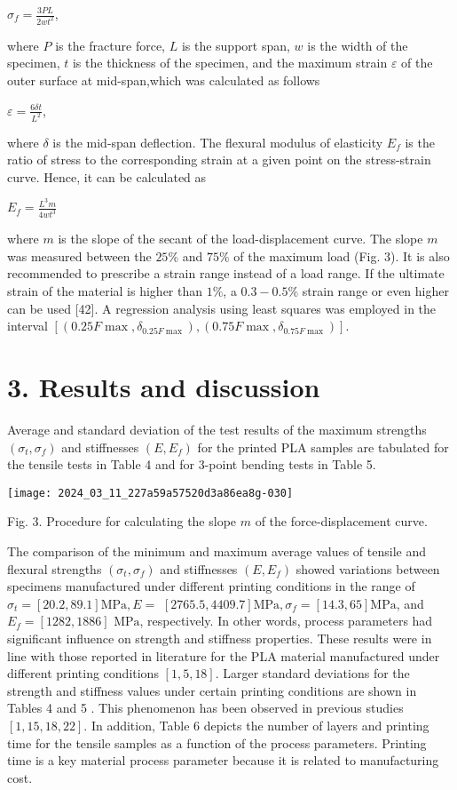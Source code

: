 \documentclass[10pt]{article}
\begin{document}
$\sigma_{f}=\frac{3 P L}{2 w t^{2}}$,

where $P$ is the fracture force, $L$ is the support span, $w$ is the width of the specimen, $t$ is the thickness of the specimen, and the maximum strain $\varepsilon$ of the outer surface at mid-span,which was calculated as follows

$\varepsilon=\frac{6 \delta t}{L^{2}}$,

where $\delta$ is the mid-span deflection. The flexural modulus of elasticity $E_{f}$ is the ratio of stress to the corresponding strain at a given point on the stress-strain curve. Hence, it can be calculated as

$E_{f}=\frac{L^{3} m}{4 w t^{3}}$

where $m$ is the slope of the secant of the load-displacement curve. The slope $m$ was measured between the $25 \%$ and $75 \%$ of the maximum load (Fig. 3). It is also recommended to prescribe a strain range instead of a load range. If the ultimate strain of the material is higher than $1 \%$, a $0.3-0.5 \%$ strain range or even higher can be used [42]. A regression analysis using least squares was employed in the interval $\left[\left(0.25 F \max , \delta_{0.25 F \max }\right),\left(0.75 F \max , \delta_{0.75 F \max }\right)\right]$.

\section*{3. Results and discussion}
Average and standard deviation of the test results of the maximum strengths $\left(\sigma_{t}, \sigma_{f}\right)$ and stiffnesses $\left(E, E_{f}\right)$ for the printed PLA samples are tabulated for the tensile tests in Table 4 and for 3-point bending tests in Table 5.

\begin{center}
\texttt{[image: 2024\_03\_11\_227a59a57520d3a86ea8g-030]}
\end{center}

Fig. 3. Procedure for calculating the slope $m$ of the force-displacement curve.

The comparison of the minimum and maximum average values of tensile and flexural strengths $\left(\sigma_{t}, \sigma_{f}\right)$ and stiffnesses $\left(E, E_{f}\right)$ showed variations between specimens manufactured under different printing conditions in the range of $\sigma_{t}=[20.2,89.1] \mathrm{MPa}, E=$ $[2765.5,4409.7] \mathrm{MPa}, \sigma_{f}=[14.3,65] \mathrm{MPa}$, and $E_{f}=[1282,1886]$ $\mathrm{MPa}$, respectively. In other words, process parameters had significant influence on strength and stiffness properties. These results were in line with those reported in literature for the PLA material manufactured under different printing conditions $[1,5,18]$. Larger standard deviations for the strength and stiffness values under certain printing conditions are shown in Tables 4 and 5 . This phenomenon has been observed in previous studies $[1,15,18,22]$. In addition, Table 6 depicts the number of layers and printing time for the tensile samples as a function of the process parameters. Printing time is a key material process parameter because it is related to manufacturing cost.
\end{document}
